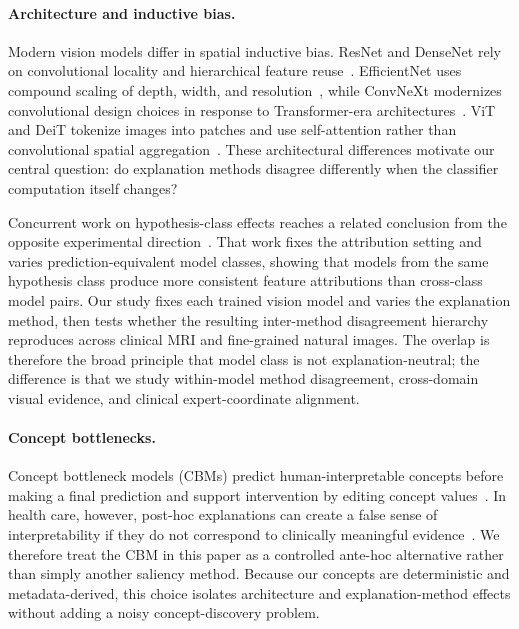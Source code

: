 \documentclass{bmvc2k}
\begin{document}
\paragraph{Architecture and inductive bias.}
Modern vision models differ in spatial inductive bias. ResNet and DenseNet rely on convolutional locality and hierarchical feature reuse~\cite{he2016resnet,huang2017densenet}. EfficientNet uses compound scaling of depth, width, and resolution~\cite{tan2019efficientnet}, while ConvNeXt modernizes convolutional design choices in response to Transformer-era architectures~\cite{liu2022convnet}. ViT and DeiT tokenize images into patches and use self-attention rather than convolutional spatial aggregation~\cite{dosovitskiy2021image,touvron2021training}. These architectural differences motivate our central question: do explanation methods disagree differently when the classifier computation itself changes?

Concurrent work on hypothesis-class effects reaches a related conclusion from the opposite experimental direction~\cite{thackshanaramana2026hypothesis}. That work fixes the attribution setting and varies prediction-equivalent model classes, showing that models from the same hypothesis class produce more consistent feature attributions than cross-class model pairs. Our study fixes each trained vision model and varies the explanation method, then tests whether the resulting inter-method disagreement hierarchy reproduces across clinical MRI and fine-grained natural images. The overlap is therefore the broad principle that model class is not explanation-neutral; the difference is that we study within-model method disagreement, cross-domain visual evidence, and clinical expert-coordinate alignment.

\paragraph{Concept bottlenecks.}
Concept bottleneck models (CBMs) predict human-interpretable concepts before making a final prediction and support intervention by editing concept values~\cite{koh2020concept}. In health care, however, post-hoc explanations can create a false sense of interpretability if they do not correspond to clinically meaningful evidence~\cite{ghassemi2021false}. We therefore treat the CBM in this paper as a controlled ante-hoc alternative rather than simply another saliency method. Because our concepts are deterministic and metadata-derived, this choice isolates architecture and explanation-method effects without adding a noisy concept-discovery problem.
\end{document}

